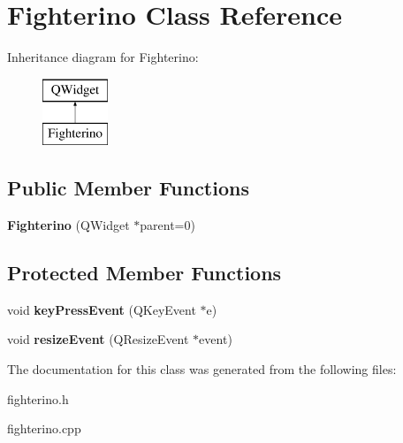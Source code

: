 \hypertarget{class_fighterino}{}\section{Fighterino Class Reference}
\label{class_fighterino}
Inheritance diagram for Fighterino\+:\begin{figure}[H]
\begin{center}
\leavevmode
\includegraphics[height=2.000000cm]{class_fighterino}
\end{center}
\end{figure}
\subsection*{Public Member Functions}
\begin{DoxyCompactItemize}
\item 
\hypertarget{class_fighterino_a133b36eb3731d07d14262c9043f536eb}{}{\bfseries Fighterino} (Q\+Widget $\ast$parent=0)\label{class_fighterino_a133b36eb3731d07d14262c9043f536eb}

\end{DoxyCompactItemize}
\subsection*{Protected Member Functions}
\begin{DoxyCompactItemize}
\item 
\hypertarget{class_fighterino_a59266485815dfc7e13c5cbb0ab3310a8}{}void {\bfseries key\+Press\+Event} (Q\+Key\+Event $\ast$e)\label{class_fighterino_a59266485815dfc7e13c5cbb0ab3310a8}

\item 
\hypertarget{class_fighterino_aa8a42ffd3f2794c406f7d7e80cb45bfd}{}void {\bfseries resize\+Event} (Q\+Resize\+Event $\ast$event)\label{class_fighterino_aa8a42ffd3f2794c406f7d7e80cb45bfd}

\end{DoxyCompactItemize}


The documentation for this class was generated from the following files\+:\begin{DoxyCompactItemize}
\item 
fighterino.\+h\item 
fighterino.\+cpp\end{DoxyCompactItemize}
